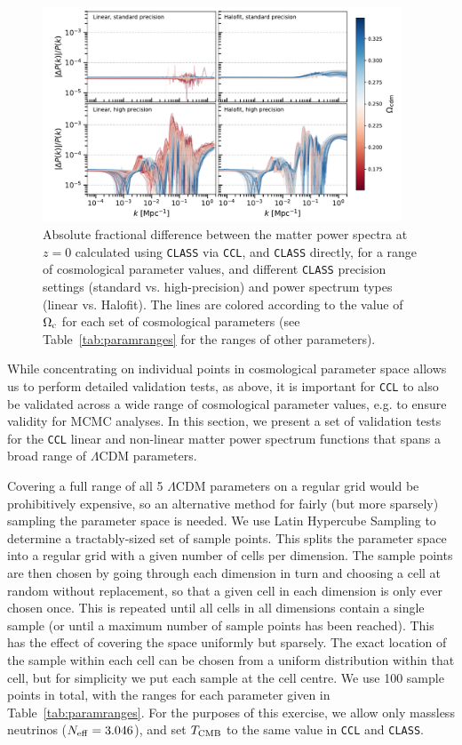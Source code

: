 \documentclass[\docopts]{\docclass}
\newcommand{\ccl}{{\tt CCL}\xspace}
\begin{document}
\begin{figure}
\centering
\includegraphics[width=0.95\textwidth]{pkdev}
\caption{Absolute fractional difference between the matter power spectra at $z=0$ calculated using {\tt CLASS} via \ccl, and {\tt CLASS} directly, for a range of cosmological parameter values, and different {\tt CLASS} precision settings (standard vs. high-precision) and power spectrum types (linear vs. Halofit). The lines are colored according to the value of $\Omega_{\rm c}$ for each set of cosmological parameters (see Table~\ref{tab:paramranges} for the ranges of other parameters).}
\label{fig:power_paramspace}
\end{figure}

While concentrating on individual points in cosmological parameter space allows us to perform detailed validation tests, as above, it is important for \ccl to also be validated across a wide range of cosmological parameter values, e.g. to ensure validity for MCMC analyses. In this section, we present a set of validation tests for the \ccl linear and non-linear matter power spectrum functions that spans a broad range of $\Lambda$CDM parameters.

Covering a full range of all 5 $\Lambda$CDM parameters on a regular grid would be prohibitively expensive, so an alternative method for fairly (but more sparsely) sampling the parameter space is needed. We use Latin Hypercube Sampling to determine a tractably-sized set of sample points. This splits the parameter space into a regular grid with a given number of cells per dimension. The sample points are then chosen by going through each dimension in turn and choosing a cell at random without replacement, so that a given cell in each dimension is only ever chosen once. This is repeated until all cells in all dimensions contain a single sample (or until a maximum number of sample points has been reached). This has the effect of covering the space uniformly but sparsely. The exact location of the sample within each cell can be chosen from a uniform distribution within that cell, but for simplicity we put each sample at the cell centre. We use 100 sample points in total, with the ranges for each parameter given in Table~\ref{tab:paramranges}. For the purposes of this exercise, we allow only massless neutrinos ($N_{\rm eff} = 3.046$), and set $T_{\rm CMB}$ to the same value in \ccl and {\tt CLASS}.
%

\end{document}
